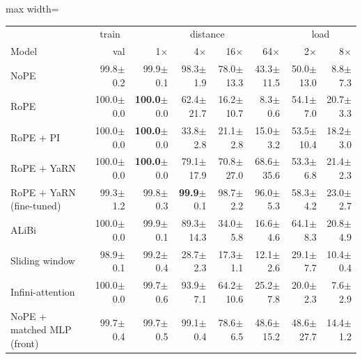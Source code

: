 \begin{table}\centering\small
\setlength{\tabcolsep}{4pt}
\begin{adjustbox}{max width=\linewidth}
\begin{tabular}{lrrrrrrr}
\toprule
 & \multicolumn{1}{c}{train} & \multicolumn{4}{c}{distance} & \multicolumn{2}{c}{load} \\
Model & val & 1$\times$ & 4$\times$ & 16$\times$ & 64$\times$ & 2$\times$ & 8$\times$ \\
\midrule
NoPE & 99.8{\scriptsize$\pm$0.2} & 99.9{\scriptsize$\pm$0.1} & 98.3{\scriptsize$\pm$1.9} & 78.0{\scriptsize$\pm$13.3} & 43.3{\scriptsize$\pm$11.5} & 50.0{\scriptsize$\pm$13.0} & 8.8{\scriptsize$\pm$7.3} \\
RoPE & 100.0{\scriptsize$\pm$0.0} & \textbf{100.0}{\scriptsize$\pm$0.0} & 62.4{\scriptsize$\pm$21.7} & 16.2{\scriptsize$\pm$10.7} & 8.3{\scriptsize$\pm$0.6} & 54.1{\scriptsize$\pm$7.0} & 20.7{\scriptsize$\pm$3.3} \\
RoPE + PI & 100.0{\scriptsize$\pm$0.0} & \textbf{100.0}{\scriptsize$\pm$0.0} & 33.8{\scriptsize$\pm$2.8} & 21.1{\scriptsize$\pm$2.8} & 15.0{\scriptsize$\pm$3.2} & 53.5{\scriptsize$\pm$10.4} & 18.2{\scriptsize$\pm$3.0} \\
RoPE + YaRN & 100.0{\scriptsize$\pm$0.0} & \textbf{100.0}{\scriptsize$\pm$0.0} & 79.1{\scriptsize$\pm$17.9} & 70.8{\scriptsize$\pm$27.0} & 68.6{\scriptsize$\pm$35.6} & 53.3{\scriptsize$\pm$6.8} & 21.4{\scriptsize$\pm$2.3} \\
RoPE + YaRN (fine-tuned) & 99.3{\scriptsize$\pm$1.2} & 99.8{\scriptsize$\pm$0.3} & \textbf{99.9}{\scriptsize$\pm$0.1} & 98.7{\scriptsize$\pm$2.2} & 96.0{\scriptsize$\pm$5.3} & 58.3{\scriptsize$\pm$4.2} & 23.0{\scriptsize$\pm$2.7} \\
ALiBi & 100.0{\scriptsize$\pm$0.0} & 99.9{\scriptsize$\pm$0.1} & 89.3{\scriptsize$\pm$14.3} & 34.0{\scriptsize$\pm$5.8} & 16.6{\scriptsize$\pm$4.6} & 64.1{\scriptsize$\pm$8.3} & 20.8{\scriptsize$\pm$4.9} \\
Sliding window & 98.9{\scriptsize$\pm$0.1} & 99.2{\scriptsize$\pm$0.4} & 28.7{\scriptsize$\pm$2.3} & 17.3{\scriptsize$\pm$1.1} & 12.1{\scriptsize$\pm$2.6} & 29.1{\scriptsize$\pm$7.7} & 10.4{\scriptsize$\pm$0.4} \\
Infini-attention & 100.0{\scriptsize$\pm$0.0} & 99.7{\scriptsize$\pm$0.6} & 93.9{\scriptsize$\pm$7.1} & 64.2{\scriptsize$\pm$10.6} & 25.2{\scriptsize$\pm$7.8} & 20.0{\scriptsize$\pm$2.3} & 7.6{\scriptsize$\pm$2.9} \\
NoPE + matched MLP (front) & 99.7{\scriptsize$\pm$0.4} & 99.7{\scriptsize$\pm$0.5} & 99.1{\scriptsize$\pm$0.4} & 78.6{\scriptsize$\pm$6.5} & 48.6{\scriptsize$\pm$15.2} & 48.6{\scriptsize$\pm$27.7} & 14.4{\scriptsize$\pm$1.2} \\

\end{tabular}
\end{adjustbox}
\end{table}

